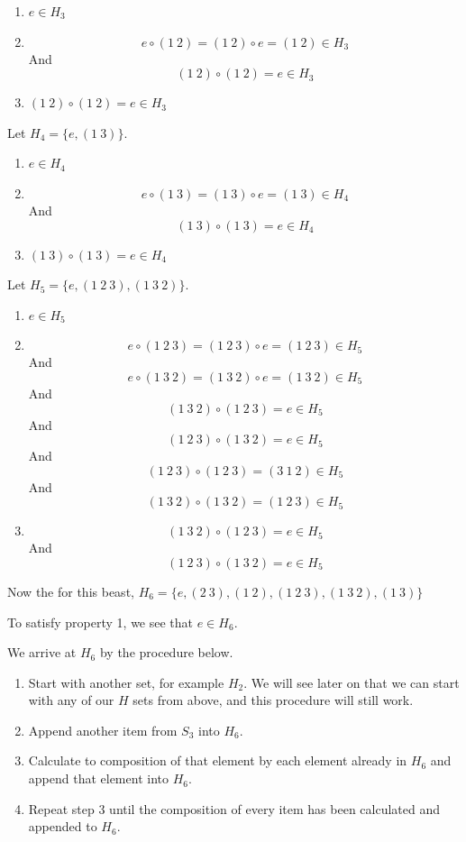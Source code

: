\documentclass[a4paper]{article}
\begin{document}
\begin{myparindent}{0pt}
\begin{enumerate}
  \item $e \in H_3$
  \item
  \[ e \circ (1 ~2) = (1 ~2) \circ e = (1 ~2) \in H_3 \]
  And
  \[ (1 ~2) \circ (1 ~2) = e \in H_3 \]
  \item $(1 ~2) \circ (1 ~2) = e \in H_3$
\end{enumerate}

Let $H_4 = \{e, (1 ~3)\}$.

\begin{enumerate}
  \item $e \in H_4$
  \item
  \[ e \circ (1 ~3) = (1 ~3) \circ e = (1 ~3) \in H_4 \]
  And
  \[ (1 ~3) \circ (1 ~3) = e \in H_4 \]
  \item $(1 ~3) \circ (1 ~3) = e \in H_4$
\end{enumerate}

Let $H_5 = \{e, (1 ~2 ~3), (1 ~3 ~2) \}$.

\begin{enumerate}
  \item $e \in H_5$
  \item
  \[ e \circ (1 ~2 ~3) = (1 ~2 ~3) \circ e = (1 ~2 ~3) \in H_5 \]
  And
  \[ e \circ (1 ~3 ~2) = (1 ~3 ~2) \circ e = (1 ~3 ~2) \in H_5 \]
  And
  \[ (1 ~3 ~2) \circ (1 ~2 ~3) = e \in H_5 \]
  And
  \[ (1 ~2 ~3) \circ (1 ~3 ~2) = e \in H_5 \]
  And
  \[ (1 ~2 ~3) \circ (1 ~2 ~3) = (3 ~1 ~2) \in H_5 \]
  And
  \[ (1 ~3 ~2) \circ (1 ~3 ~2) = (1 ~2 ~3) \in H_5 \]

  \item
  \[ (1 ~3 ~2) \circ (1 ~2 ~3) = e \in H_5 \]
  And
  \[ (1 ~2 ~3) \circ (1 ~3 ~2) = e \in H_5 \]
\end{enumerate}

Now the for this beast, $H_6 = \{ e, (2 ~3), (1 ~2), (1 ~2 ~3), (1 ~3 ~2), (1 ~3) \}$
\newline

To satisfy property 1, we see that $e \in H_6$.

We arrive at $H_6$ by the procedure below.
\begin{enumerate}
  \item Start with another set, for example $H_2$. We will see later on that we
  can start with any of our $H$ sets from above, and this procedure will still
  work.
  \item Append another item from $S_3$ into $H_6$.
  \item Calculate to composition of that element by each element already in
  $H_6$ and append that element into $H_6$.
  \item Repeat step 3 until the composition of every item has been calculated
  and appended to $H_6$.
\end{enumerate}


\end{myparindent}
\end{document}
